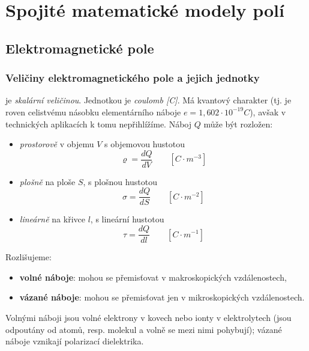 \chapter{Spojité matematické modely polí}
\minitoc
  \section{Elektromagnetické pole}       
    \subsection{Veličiny elektromagnetického pole a jejich jednotky}
       je \emph{skalární veličinou}. Jednotkou je \emph{coulomb [C]}. Má
         kvantový charakter (tj. je roven celistvému násobku elementárního náboje $e =
         1,602\cdot10^{-19}C$), avšak v technických aplikacích k tomu nepřihlížíme. Náboj $Q$
         může být rozložen:
         \begin{itemize}\addtolength{\itemsep}{-0.5\baselineskip}
            \item \emph{prostorově} v objemu $V$ s objemovou hustotou
               \begin{equation}\label{TEMP:eq_q_varrho}
                  \varrho = \frac{dQ}{dV} \qquad [C\cdot m^{-3}]
               \end{equation}               
            \item \emph{plošně} na ploše $S$, s plošnou hustotou
               \begin{equation}\label{TEMP:eq_q_sigma}
                  \sigma = \frac{dQ}{dS} \qquad [C\cdot m^{-2}]
               \end{equation}                 
            \item \emph{lineárně} na křivce $l$, s lineární hustotou
               \begin{equation}\label{TEMP:eq_q_tau}
                  \tau = \frac{dQ}{dl} \qquad [C\cdot m^{-1}]
               \end{equation}                 
         \end{itemize}
         Rozlišujeme:
           \begin{itemize}\addtolength{\itemsep}{-0.5\baselineskip}
             \item \textbf{volné náboje}: mohou se přemisťovat v makroskopických
             vzdálenostech,
             \item \textbf{vázané náboje}: mohou se přemisťovat jen v
             mikroskopických vzdálenostech.
           \end{itemize}
         Volnými náboji jsou volné elektrony v kovech nebo ionty v elektrolytech (jsou odpoutány od
         atomů, resp. molekul a volně se mezi nimi pohybují); vázané náboje vznikají polarizací
         dielektrika.
         
